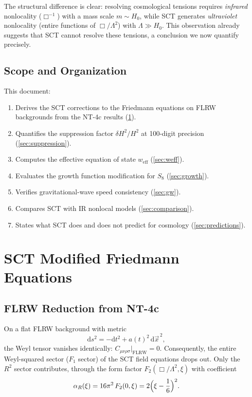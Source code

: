 \documentclass[11pt,a4paper]{article}
\renewcommand{\dd}{\mathrm{d}}
\newcommand{\Lam}{\Lambda}
\theoremstyle{plain}
\theoremstyle{definition}
\begin{document}
The structural difference is clear: resolving cosmological tensions
requires \emph{infrared} nonlocality ($\Box^{-1}$) with a mass scale
$m \sim H_0$, while SCT generates \emph{ultraviolet} nonlocality
(entire functions of $\Box/\Lam^2$) with $\Lam \gg H_0$. This
observation already suggests that SCT cannot resolve these tensions, a
conclusion we now quantify precisely.

\subsection{Scope and Organization}

This document:
\begin{enumerate}[nosep]
  \item Derives the SCT corrections to the Friedmann equations on FLRW
    backgrounds from the NT-4c results (\cref{sec:friedmann}).
  \item Quantifies the suppression factor $\delta H^2/H^2$ at 100-digit
    precision (\cref{sec:suppression}).
  \item Computes the effective equation of state $w_{\mathrm{eff}}$
    (\cref{sec:weff}).
  \item Evaluates the growth function modification for $S_8$
    (\cref{sec:growth}).
  \item Verifies gravitational-wave speed consistency
    (\cref{sec:gw}).
  \item Compares SCT with IR nonlocal models (\cref{sec:comparison}).
  \item States what SCT does and does not predict for cosmology
    (\cref{sec:predictions}).
\end{enumerate}

\section{SCT Modified Friedmann Equations}\label{sec:friedmann}

\subsection{FLRW Reduction from NT-4c}

On a flat FLRW background with metric
\begin{equation}\label{eq:flrw-metric}
  \dd s^2 = -\dd t^2 + a(t)^2\,\dd\vec{x}^{\,2},
\end{equation}
the Weyl tensor vanishes identically:
$C_{\mu\nu\rho\sigma}|_{\mathrm{FLRW}} = 0$. Consequently, the entire
Weyl-squared sector ($F_1$ sector) of the SCT field equations drops out.
Only the $R^2$ sector contributes, through the form factor
$F_2(\Box/\Lam^2, \xi)$ with coefficient
\begin{equation}\label{eq:alphaR}
  \alpha_R(\xi) = 16\pi^2\,F_2(0,\xi) = 2\Bigl(\xi - \frac{1}{6}\Bigr)^2.
\end{equation}
\end{document}
